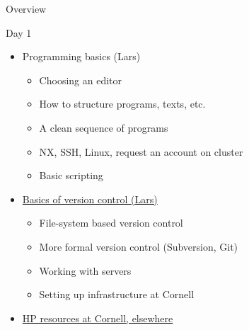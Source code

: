 \begin{frame}{Overview}
\begin{block}{Day 1}
\begin{itemize}[<+->]
\item Programming basics (Lars)
\begin{itemize}
\item Choosing an editor
\item How to structure programs, texts, etc.
\item A clean sequence of programs
\item NX, SSH, Linux, request an account on cluster
\item Basic scripting
\end{itemize}
\item  \href{day1-2.pdf}{Basics of version control (Lars)}
\begin{itemize}
\item File-system based version control
\item More formal version control (Subversion, Git)
\item Working with servers
\item Setting up infrastructure at Cornell
\end{itemize}
\item  \href{day1-3.pdf}{HP resources at Cornell, elsewhere }
\end{itemize}
\end{block}
\end{frame}